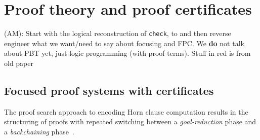 \section{Proof theory and proof certificates}


\begin{metanote}
  (AM): Start with the logical reconstruction of \texttt{check}, to and then reverse engineer what we want/need to say about focusing and FPC. We \textbf{do} not talk about PBT yet, just logic programming (with proof terms). %
%
Stuff in red is from old paper
\end{metanote}

\subsection{Focused proof systems with certificates}
\label{ssec:focused}


The proof search approach to encoding Horn clause computation
results in the structuring of proofs with repeated
switching between a \emph{goal-reduction} phase and a
\emph{backchaining} phase~\cite{miller91apal}.

